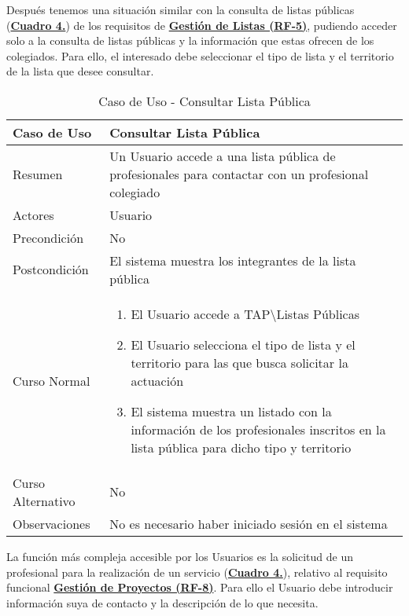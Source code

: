 \addtocounter{tabla}{1}
Después tenemos una situación similar con la consulta de listas públicas (\textbf{\hyperref[tab:cuuConsultaLstPub]{Cuadro 4.}}) de los requisitos de \textbf{\hyperref[tab:rfGestLst]{Gestión de Listas (RF-5)}}, pudiendo acceder solo a la consulta de listas públicas y la información que estas ofrecen de los colegiados. Para ello, el interesado debe seleccionar el tipo de lista y el territorio de la lista que desee consultar.

\begin{table}[!htbp]
  \centering  \addtocounter{casouso}{1}
  \begin{tabular}{|l | p{100mm}|}
    \textbf{Caso de Uso}  & \textbf{Consultar Lista Pública} \\ \hline
    Resumen 			 & Un Usuario accede a una lista pública de profesionales para contactar con un profesional colegiado \\ \hline
    Actores  		 & Usuario \\ \hline
    Precondición  	 & No \\ \hline
    Postcondición  	 & El sistema muestra los integrantes de la lista pública \\ \hline
    Curso Normal   	 & \begin{enumerate}
	  \item El Usuario accede a TAP\textbackslash Listas Públicas
	  \item El Usuario selecciona el tipo de lista y el territorio para las que busca solicitar la actuación
	  \item El sistema muestra un listado con la información de los profesionales inscritos en la lista pública para dicho tipo y territorio
    \end{enumerate}  \\ \hline
    Curso Alternativo  & No  \\ \hline
    Observaciones 	 & No es necesario haber iniciado sesión en el sistema  \\ \hline
  \end{tabular}
  \caption{Caso de Uso  - Consultar Lista Pública}
  \label{tab:cuuConsultaLstPub}
\end{table}
\FloatBarrier

\addtocounter{tabla}{1}
La función más compleja accesible por los Usuarios es la solicitud de un profesional para la realización de un servicio (\textbf{\hyperref[tab:cuuRegPeticProf]{Cuadro 4.}}), relativo al requisito funcional \textbf{\hyperref[tab:rfGestProyectos]{Gestión de Proyectos (RF-8)}}. Para ello el Usuario debe introducir información suya de contacto y la descripción de lo que necesita. 

